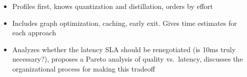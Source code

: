 \begin{interviewq}
\goodgreat
\begin{itemize}
    \item {} Profiles first, knows quantization and distillation, orders by effort
    \item {} Includes graph optimization, caching, early exit. Gives time estimates for each approach
    \item {} Analyzes whether the latency SLA should be renegotiated (is 10ms truly necessary?), proposes a Pareto analysis of quality vs.\ latency, discusses the organizational process for making this tradeoff
\end{itemize}

\end{interviewq}

